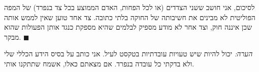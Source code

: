 \documentclass[]{../../../../tex/classes/styledArticle}
\begin{document}
	לסיכום, אני חושב ששני הצדדים (או לכל הפחות, האדם הממוצע בכל צד בנפרד) של המפה הפוליטית לא מבינים את חשיבותה של החוקה בלתי כתובה. צד אחד טוען שאין לממש אותה שכן איננה חוק, וצד אחר לא מודע מספיק לבלמים שהיא מספקת כנגד אותן הפעולות שהוא מבקר. \hfill $\blacksquare$
	
	\textit{הערה: }יכול להיות שיש טעויות עובדתיות בטקסט לעיל. אני כותב על בסיס הידע הכללי שלי ולא בדקתי כל עובדה בנפרד. אם מצאתם כאלו, אשמח שתתקנו אותי. 
	
	
	\ndoc
\end{document}
